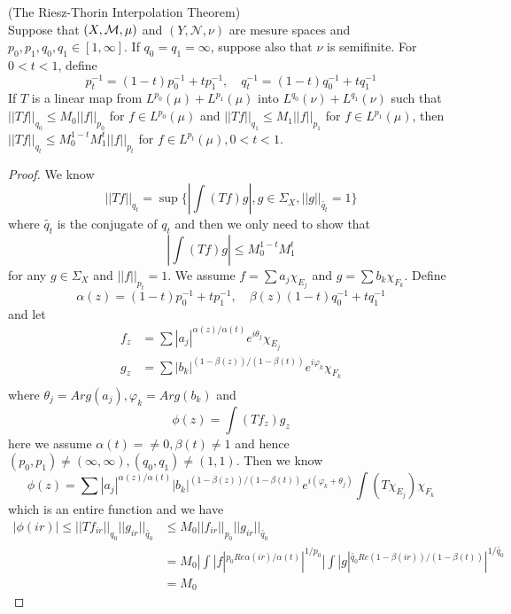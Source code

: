 \begin{theorem}
    (The Riesz-Thorin Interpolation Theorem)\\Suppose that $(X,\mathcal{M},\mu)$ and $(Y,\mathcal{N},\nu)$ are mesure spaces and $p_0,p_1,q_0,q_1 \in [1,\infty]$. If $q_0 = q_1 = \infty$, suppose also that $\nu$ is semifinite. For $0<t<1$, define
    \[
    p_t^{-1} = (1-t)p_0^{-1} + tp_1^{-1},\quad q_t^{-1} = (1-t)q_0^{-1}+tq_1^{-1}
    \]
    If $T$ is a linear map from $L^{p_0}(\mu) + L^{p_1}(\mu)$ into $L^{q_0}(\nu)+L^{q_1}(\nu)$ such that $||Tf||_{q_0} \leq M_0||f||_{p_0}$ for $f\in L^{p_0}(\mu)$ and $||Tf||_{q_1} \leq M_1||f||_{p_1}$ for $f\in L^{p_1}(\mu)$, then $||Tf||_{q_t} \leq M_0^{1-t}M_1^t ||f||_{p_t}$ for $f\in L^{p_t}(\mu), 0 < t < 1$. 
\end{theorem}
\begin{proof}\par
    We know
    \[||Tf||_{q_t} = \sup\{|\int (Tf)g|, g\in \Sigma_X, ||g||_{\tilde{q_t}} = 1\}\]
    where $\tilde{q_t}$ is the conjugate of $q_t$ and then we only need to show that
    \[
    |\int (Tf)g| \leq M_0^{1-t}M_1^t
    \]
    for any $g\in \Sigma_X$ and $||f||_{p_t} = 1$. We assume $f = \sum\limits a_j\chi_{E_j}$ and $g = \sum\limits b_k\chi_{F_k}$. Define
    \[
    \alpha(z) = (1-t)p_0^{-1} + t p_1^{-1},\quad \beta(z) (1-t)q_0^{-1} + t q_1^{-1}
    \]
    and let
    \[
    \begin{aligned}
        f_z &= \sum |a_j|^{\alpha(z)/\alpha(t)}e^{i\theta_j}\chi_{E_j} \\
        g_z &= \sum |b_k|^{(1-\beta(z))/(1-\beta(t))}e^{i\varphi_k}\chi_{F_k} \\
    \end{aligned}
    \]
    where $\theta_j = Arg(a_j), \varphi_k = Arg(b_k)$ and
    \[
    \phi(z) = \int (Tf_z)g_z
    \]
    here we assume $\alpha(t)=\neq 0, \beta(t)\neq 1$ and hence $(p_0,p_1) \neq (\infty,\infty), (q_0,q_1)\neq (1,1)$. Then we know
    \[
    \phi(z) = \sum\limits |a_j|^{\alpha(z)/\alpha(t)}|b_k|^{(1-\beta(z))/(1-\beta(t))}e^{i(\varphi_k+\theta_j)}\int(T\chi_{E_j})\chi_{F_k}
    \]
    which is an entire function and we have
    \[
    \begin{aligned}
        |\phi(ir)| \leq ||Tf_{ir}||_{q_0}||g_{ir}||_{\tilde{q_0}} &\leq M_0 ||f_{ir}||_{p_0} ||g_{ir}||_{\tilde{q_0}} \\ &= M_0 |\int |f|^{p_0Re\alpha(ir)/\alpha(t)}|^{1/p_0}|\int |g|^{\tilde{q_0}Re(1-\beta(ir))/(1-\beta(t))}|^{1/\tilde{q_0}} \\
        &= M_0
    \end{aligned}
\]
\end{proof}
